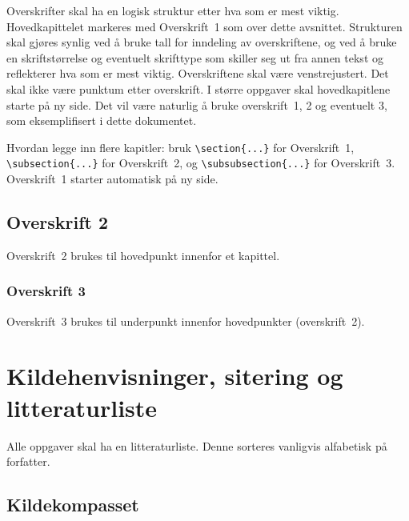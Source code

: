\documentclass{USN-BSc}
\begin{document}
Overskrifter skal ha en logisk struktur etter hva som er mest viktig.
Hovedkapittelet markeres med Overskrift~1 som over dette avsnittet. Strukturen
skal gjøres synlig ved å bruke tall for inndeling av overskriftene, og ved å
bruke en skriftstørrelse og eventuelt skrifttype som skiller seg ut fra annen
tekst og reflekterer hva som er mest viktig. Overskriftene skal være
venstrejustert. Det skal ikke være punktum etter overskrift. I større oppgaver
skal hovedkapitlene starte på ny side. Det vil være naturlig å bruke
overskrift~1, 2 og eventuelt 3, som eksemplifisert i dette dokumentet.

Hvordan legge inn flere kapitler: bruk \verb|\section{...}| for Overskrift~1,
\verb|\subsection{...}| for Overskrift~2, og \verb|\subsubsection{...}| for
Overskrift~3. Overskrift~1 starter automatisk på ny side.

\subsection{Overskrift 2}

Overskrift~2 brukes til hovedpunkt innenfor et kapittel.

\subsubsection{Overskrift 3}

Overskrift~3 brukes til underpunkt innenfor hovedpunkter (overskrift~2).

\section{Kildehenvisninger, sitering og litteraturliste}

Alle oppgaver skal ha en litteraturliste. Denne sorteres vanligvis alfabetisk
på forfatter.

\subsection{Kildekompasset}
\end{document}
